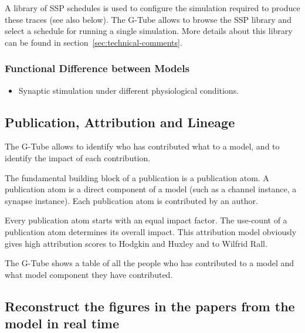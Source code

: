 \documentclass[12pt]{article}
\begin{document}
A library of SSP schedules is used to configure the simulation
required to produce these traces (see also below).  The G-Tube allows
to browse the SSP library and select a schedule for running a single
simulation.  More details about this library can be found in
section~\ref{sec:technical-comments}.


\subsubsection{Functional Difference between Models}

\begin{itemize}
\item Synaptic stimulation under different physiological conditions.
\end{itemize}


\subsection{Publication, Attribution and Lineage}

The G-Tube allows to identify who has contributed what to a model, and
to identify the impact of each contribution.

The fundamental building block of a publication is a publication atom.
A publication atom is a direct component of a model (such as a channel
instance, a synapse instance).  Each publication atom is contributed
by an author.

Every publication atom starts with an equal impact factor.  The
use-count of a publication atom determines its overall impact.  This
attribution model obviously gives high attribution scores to Hodgkin
and Huxley and to Wilfrid Rall.

The G-Tube shows a table of all the people who has contributed to a
model and what model component they have contributed.




\subsection{Reconstruct the figures in the papers from the model in real time}
\end{document}
